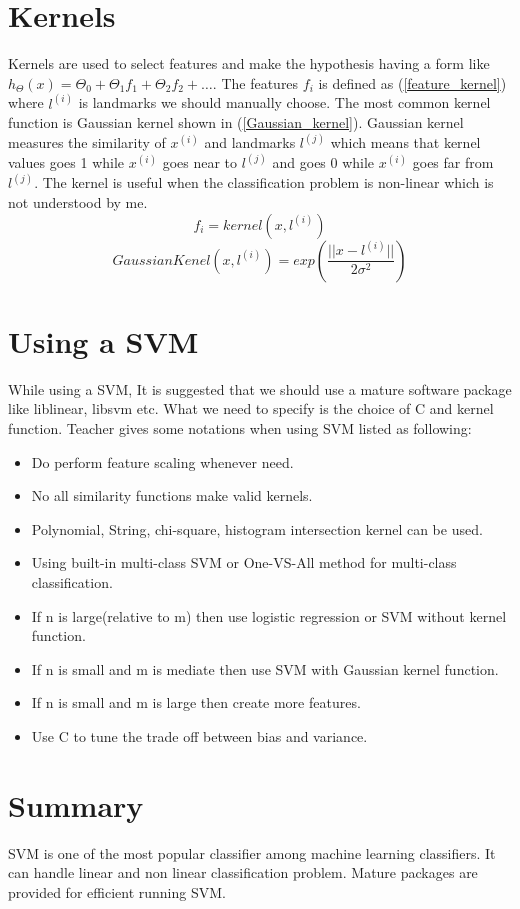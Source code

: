 \documentclass{article}
\begin{document}
\section {Kernels}
Kernels are used to select features and make the hypothesis having a form like $h_{\Theta}(x) = \Theta_{0} + \Theta_{1}f_{1} + \Theta_{2}f_{2} + \ldots$. The features $f_{i}$ is defined as (\ref{feature_kernel}) where $l^{(i)}$ is landmarks we should manually choose. The most common kernel function is Gaussian kernel shown in (\ref{Gaussian_kernel}). Gaussian kernel measures the similarity of $x^{(i)}$ and landmarks $l^{(j)}$ which means that kernel values goes 1 while $x^{(i)}$ goes near to $l^{(j)}$ and goes 0 while $x^{(i)}$ goes far from $l^{(j)}$. The kernel is useful when the classification problem is non-linear which is not understood by me.
\begin{equation}\label{feature_kernel}
f_{i} = kernel(x, l^{(i)})
\end{equation}
\begin{equation}\label{Gaussian_kernel}
GaussianKenel(x, l^{(i)}) = exp(\frac{||x-l^{(i)}||}{2\sigma^{2}})
\end{equation}

\section{Using a SVM}
While using a SVM, It is suggested that we should use a mature software package like liblinear, libsvm etc. What we need to specify is the choice of C and kernel function. Teacher gives some notations when using SVM listed as following:
\begin{itemize}
\item Do perform feature scaling whenever need.
\item No all similarity functions make valid kernels.
\item Polynomial, String, chi-square, histogram intersection kernel can be used.
\item Using built-in multi-class SVM or One-VS-All method for multi-class classification.
\item If n is large(relative to m) then use logistic regression or SVM without kernel function.
\item If n is small and m is mediate then use SVM with Gaussian kernel function.
\item If n is small and m is large then create more features.
\item Use C to tune the trade off between bias and variance. 
\end{itemize}

\section{Summary}
SVM is one of the most popular classifier among machine learning classifiers. It can handle linear and non linear classification problem. Mature packages are provided for efficient running SVM.
\end{document}
